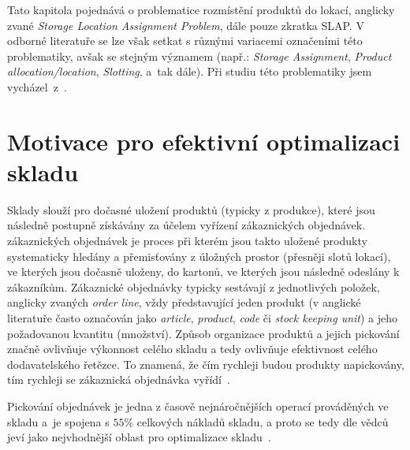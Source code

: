Tato kapitola pojednává o problematice rozmístění produktů do lokací, anglicky zvané \emph{Storage Location Assignment Problem}, dále pouze zkratka SLAP. V odborné literatuře se lze však setkat s různými variacemi označeními této problematiky, avšak se stejným významem (např.: \emph{Storage Assignment}, \emph{Product allocation/location}, \emph{Slotting}, a~tak dále). Při studiu této problematiky jsem vycházel~z~\cite{slapSeacomp, optimisationOrderPickingGA, exactTimeSlap, whModelSim, slapReview, slapGaMultiObj, slapPickAndPass}.




\section{Motivace pro efektivní optimalizaci skladu} %
\label{motivace}
Sklady slouží pro dočasné uložení produktů (typicky z produkce), které jsou následně postupně získávány za účelem vyřízení zákaznických objednávek.  zákaznických objednávek je proces při kterém jsou takto uložené produkty systematicky hledány a přemisťovány z úložných prostor (přesněji slotů lokací), ve kterých jsou dočasně uloženy, do kartonů, ve kterých jsou následně odeslány k zákazníkům. Zákaznické objednávky typicky sestávají z jednotlivých položek, anglicky zvaných \emph{order line}, vždy představující jeden produkt (v anglické literatuře často označován jako \emph{article}, \emph{product}, \emph{code} či \emph{stock keeping unit}) a jeho požadovanou kvantitu (množství). Způsob organizace produktů a jejich pickování značně ovlivňuje výkonnost celého skladu a tedy ovlivňuje efektivnost celého dodavatelského řetězce. To znamená, že čím rychleji budou produkty napickovány, tím rychleji se zákaznická objednávka vyřídí~\cite{optimisationOrderPickingGA}.

Pickování objednávek je jedna z časově nejnáročnějších operací prováděných ve skladu a~je spojena s $55\%$ celkových nákladů skladu, a proto se tedy dle vědců jeví jako nejvhodnější oblast pro optimalizace skladu~\cite{optimisationOrderPickingGA}.

\addtocounter{footnote}{-1}

